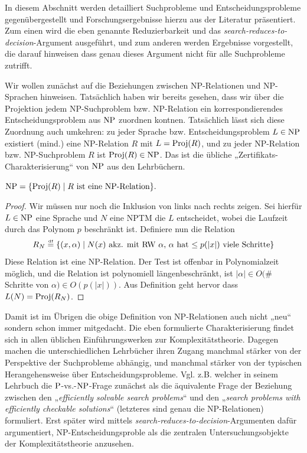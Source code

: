 In diesem Abschnitt werden detailliert Suchprobleme und Entscheidungsprobleme gegenübergestellt und Forschungsergebnisse hierzu aus der Literatur präsentiert.
Zum einen wird die eben genannte Reduzierbarkeit und das \emph{search-reduces-to-decision}-Argument ausgeführt, und zum anderen werden Ergebnisse vorgestellt, die darauf hinweisen dass genau dieses Argument nicht für alle Suchprobleme zutrifft.

Wir wollen zunächst auf die Beziehungen zwischen NP-Relationen und NP-Sprachen hinweisen.
Tatsächlich haben wir bereits gesehen, dass wir über die Projektion jedem NP-Suchproblem bzw. NP-Relation ein korrespondierendes Entscheidungsproblem aus $\NP$ zuordnen kontnen. Tatsächlich lässt sich diese Zuordnung auch umkehren: zu jeder Sprache bzw. Entscheidungsproblem $L\in \NP$ existiert (mind.) eine NP-Relation $R$ mit $L=\Proj(R)$, und zu jeder NP-Relation bzw. NP-Suchproblem $R$ ist $\Proj(R)\in\NP$. Das ist die übliche „Zertifikats-Charakterisierung“ von $\NP$ aus den Lehrbüchern.
\begin{observation}\label{obs:np-certificate-def}
    $\NP = \{ \Proj(R) \mid \text{$R$ ist eine NP-Relation} \}.$
\end{observation}
\begin{proof}
    Wir müssen nur noch die Inklusion von links nach rechts zeigen. Sei hierfür $L\in\NP$ eine Sprache und $N$ eine NPTM die $L$ entscheidet, wobei die Laufzeit durch das Polynom $p$ beschränkt ist. Definiere nun die Relation
    \[ R_N  \defeq \{ (x, \alpha) \mid \text{$N(x)$ akz. mit RW $\alpha$, $\alpha$ hat $\leq p(|x|)$ viele Schritte} \} \]
    Diese Relation ist eine NP-Relation. Der Test ist offenbar in Polynomialzeit möglich, und die Relation ist polynomiell längenbeschränkt, ist $|\alpha|\in O($\# Schritte von $\alpha)\in O(p(|x|))$.
    Aus Definition geht hervor dass $L(N) = \Proj(R_N)$.
\end{proof}
Damit ist im Übrigen die obige Definition von NP-Relationen auch nicht „neu“ sondern schon immer mitgedacht. Die eben formulierte Charakterisierung findet sich in allen üblichen Einführungswerken zur Komplexitätstheorie. Dagegen machen die unterschiedlichen Lehrbücher ihren Zugang manchmal stärker von der Perspektive der Suchprobleme abhängig, und manchmal stärker von der typischen Herangehensweise über Entscheidungsprobleme.
Vgl. z.B. \textcite{goldreich_computational_2008} welcher in seinem Lehrbuch die $\P$-vs.-$\NP$-Frage zunächst als die äquivalente Frage der Beziehung zwischen den „\emph{efficiently solvable search problems}“ und den „\emph{search problems with efficiently checkable solutions}“ (letzteres sind genau die NP-Relationen) formuliert. Erst später wird mittels \emph{search-reduces-to-decision}-Argumenten dafür argumentiert, NP-Entscheidungsproble als die zentralen Untersuchungsobjekte der Komplexitätstheorie anzusehen.

